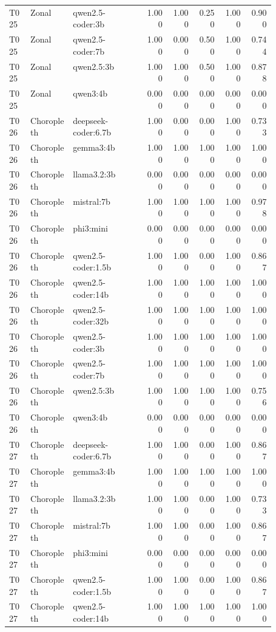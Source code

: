\begin{longtable}{p{0.08\linewidth}p{0.16\linewidth}p{0.27\linewidth}rrrrr}
T025 & Zonal & qwen2.5-coder:3b & 1.000 & 1.000 & 0.250 & 1.000 & 0.900 \\
T025 & Zonal & qwen2.5-coder:7b & 1.000 & 0.000 & 0.500 & 1.000 & 0.744 \\
T025 & Zonal & qwen2.5:3b & 1.000 & 1.000 & 0.500 & 1.000 & 0.878 \\
T025 & Zonal & qwen3:4b & 0.000 & 0.000 & 0.000 & 0.000 & 0.000 \\
T026 & Choropleth & deepseek-coder:6.7b & 1.000 & 0.000 & 0.000 & 1.000 & 0.733 \\
T026 & Choropleth & gemma3:4b & 1.000 & 1.000 & 1.000 & 1.000 & 1.000 \\
T026 & Choropleth & llama3.2:3b & 0.000 & 0.000 & 0.000 & 0.000 & 0.000 \\
T026 & Choropleth & mistral:7b & 1.000 & 1.000 & 1.000 & 1.000 & 0.978 \\
T026 & Choropleth & phi3:mini & 0.000 & 0.000 & 0.000 & 0.000 & 0.000 \\
T026 & Choropleth & qwen2.5-coder:1.5b & 1.000 & 1.000 & 0.000 & 1.000 & 0.867 \\
T026 & Choropleth & qwen2.5-coder:14b & 1.000 & 1.000 & 1.000 & 1.000 & 1.000 \\
T026 & Choropleth & qwen2.5-coder:32b & 1.000 & 1.000 & 1.000 & 1.000 & 1.000 \\
T026 & Choropleth & qwen2.5-coder:3b & 1.000 & 1.000 & 1.000 & 1.000 & 1.000 \\
T026 & Choropleth & qwen2.5-coder:7b & 1.000 & 1.000 & 1.000 & 1.000 & 1.000 \\
T026 & Choropleth & qwen2.5:3b & 1.000 & 1.000 & 1.000 & 1.000 & 0.756 \\
T026 & Choropleth & qwen3:4b & 0.000 & 0.000 & 0.000 & 0.000 & 0.000 \\
T027 & Choropleth & deepseek-coder:6.7b & 1.000 & 1.000 & 0.000 & 1.000 & 0.867 \\
T027 & Choropleth & gemma3:4b & 1.000 & 1.000 & 1.000 & 1.000 & 1.000 \\
T027 & Choropleth & llama3.2:3b & 1.000 & 1.000 & 0.000 & 1.000 & 0.733 \\
T027 & Choropleth & mistral:7b & 1.000 & 1.000 & 0.000 & 1.000 & 0.867 \\
T027 & Choropleth & phi3:mini & 0.000 & 0.000 & 0.000 & 0.000 & 0.000 \\
T027 & Choropleth & qwen2.5-coder:1.5b & 1.000 & 1.000 & 0.000 & 1.000 & 0.867 \\
T027 & Choropleth & qwen2.5-coder:14b & 1.000 & 1.000 & 1.000 & 1.000 & 1.000 \\

\end{longtable}
